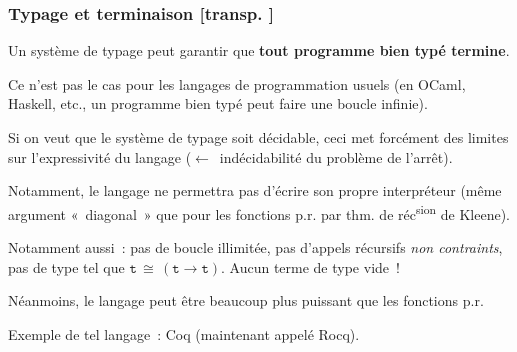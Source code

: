 \documentclass[mathserif,a4paper,aspectratio=169]{beamer}
\renewcommand{\frametitle}[1]{\subsubsection*{#1 {\footnotesize[transp. \insertframenumber]}}}
\begin{document}
%
\begin{frame}
\label{typing-and-termination}
\frametitle{Typage et terminaison}

Un système de typage \alert{peut} garantir que \textbf{tout programme
  bien typé termine}.

\bigskip

Ce \alert{n'est pas le cas} pour les langages de programmation usuels
(en OCaml, Haskell, etc., un programme bien typé peut faire une boucle
infinie).

\bigskip

Si on veut que le système de typage soit décidable, ceci met forcément
des \alert{limites sur l'expressivité} du langage
($\leftarrow$ indécidabilité du problème de l'arrêt).

\bigskip

Notamment, le langage ne permettra pas d'écrire son propre
interpréteur (même argument « diagonal » que pour les fonctions p.r.
par thm. de réc\textsuperscript{sion} de Kleene).

\bigskip

Notamment aussi : pas de boucle illimitée, pas d'appels récursifs
\emph{non contraints}, pas de type tel que $\mathtt{t} \,\cong\,
(\mathtt{t}\rightarrow \mathtt{t})$.  Aucun terme de type vide !

\bigskip

Néanmoins, le langage peut être \alert{beaucoup plus puissant} que les
fonctions p.r.

\bigskip

Exemple de tel langage : Coq (maintenant appelé Rocq).

\end{frame}
%
\end{document}

